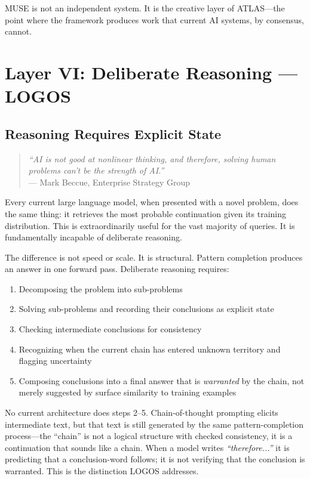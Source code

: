 \documentclass[12pt]{article}
\begin{document}
MUSE is not an independent system. It is the creative layer of ATLAS---the point where the framework produces work that current AI systems, by consensus, cannot.

\section{Layer VI: Deliberate Reasoning --- LOGOS}
\label{sec:logos}

\subsection{Reasoning Requires Explicit State}

\begin{quote}
\textit{``AI is not good at nonlinear thinking, and therefore, solving human problems can't be the strength of AI.''}\\
\hfill --- Mark Beccue, Enterprise Strategy Group \cite{beccue2024}
\end{quote}

Every current large language model, when presented with a novel problem, does the same thing: it retrieves the most probable continuation given its training distribution. This is extraordinarily useful for the vast majority of queries. It is fundamentally incapable of deliberate reasoning.

The difference is not speed or scale. It is structural. Pattern completion produces an answer in one forward pass. Deliberate reasoning requires:
\begin{enumerate}
    \item Decomposing the problem into sub-problems
    \item Solving sub-problems and recording their conclusions as explicit state
    \item Checking intermediate conclusions for consistency
    \item Recognizing when the current chain has entered unknown territory and flagging uncertainty
    \item Composing conclusions into a final answer that is \textit{warranted} by the chain, not merely suggested by surface similarity to training examples
\end{enumerate}

No current architecture does steps 2--5. Chain-of-thought prompting \cite{wei2022} elicits intermediate text, but that text is still generated by the same pattern-completion process---the ``chain'' is not a logical structure with checked consistency, it is a continuation that sounds like a chain. When a model writes \textit{``therefore...''} it is predicting that a conclusion-word follows; it is not verifying that the conclusion is warranted. This is the distinction LOGOS addresses.
\end{document}
